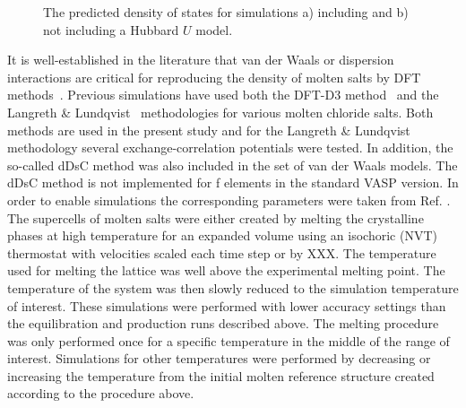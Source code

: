 \documentclass[preprint,3p,10pt,twocolumn,number,sort&compress]{elsarticle}
\begin{document}
\begin{figure}[htb]
\centering
\caption{The predicted density of states for simulations a) including and b) not including a Hubbard $U$ model.} 
\label{fig:DOS}
\end{figure}

It is well-established in the literature that van der Waals or dispersion interactions are critical for reproducing the density of molten salts by DFT methods~\cite{}. Previous simulations have used both the DFT-D3 method~\cite{} and the Langreth \& Lundqvist~\cite{} methodologies for various molten chloride salts. Both methods are used in the present study and for the Langreth \& Lundqvist~\cite{}  methodology several exchange-correlation potentials were tested. In addition, the so-called dDsC method was also included in the set of van der Waals models. The dDsC method is not implemented for f elements in the standard VASP version. In order to enable simulations the corresponding parameters were taken from Ref. \cite{}. The supercells of molten salts were either created by melting the crystalline phases at high temperature for an expanded volume using an isochoric (NVT) thermostat with velocities scaled each time step or by XXX. The temperature used for melting the lattice was well above the experimental melting point. The temperature of the system was then slowly reduced to the simulation temperature of interest. These simulations were performed with lower accuracy settings than the equilibration and production runs described above. The melting procedure was only performed once for a specific temperature in the middle of the range of interest. Simulations for other temperatures were performed by decreasing or increasing the temperature from the initial molten reference structure created according to the procedure above.
\end{document}
